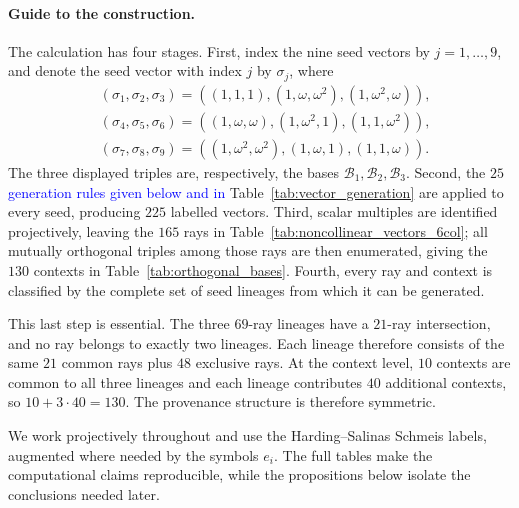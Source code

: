 \documentclass[%
  reprint,
  superscriptaddress,
  showkeys,
  amsmath,amssymb,
  aps,pra,
  longbibliography,
  floatfix,
  x11names
]{revtex4-2}
\DeclareRobustCommand{\chg}[1]{\textcolor{blue}{#1}}
\begin{document}
\paragraph*{Guide to the construction.}
The calculation has four stages.  
First, index the nine seed vectors 
by $j=1,\ldots,9$, and denote 
the seed vector with index $j$ by 
$\sigma_j$, where
\[
\begin{aligned}
&\ensuremath{(\sigma_1,\sigma_2,\sigma_3)=((1,1,1),(1,\omega,\omega^2),(1,\omega^2,\omega))},\\
&\ensuremath{(\sigma_4,\sigma_5,\sigma_6)=((1,\omega,\omega),(1,\omega^2,1),(1,1,\omega^2))},\\
&\ensuremath{(\sigma_7,\sigma_8,\sigma_9)=((1,\omega^2,\omega^2),(1,\omega,1),(1,1,\omega))}.
\end{aligned}
\]
The three displayed triples are, respectively, the bases \(\mathcal B_1,\mathcal B_2,\mathcal B_3\).
Second, the $25$ \chg{generation rules given below and in} Table~\ref{tab:vector_generation} are applied to every seed, producing $225$ labelled vectors.  Third, scalar multiples are identified projectively, leaving the $165$ rays in Table~\ref{tab:noncollinear_vectors_6col}; all mutually orthogonal triples among those rays are then enumerated, giving the $130$ contexts in Table~\ref{tab:orthogonal_bases}.  Fourth, every ray and context is classified by the complete set of seed lineages from which it can be generated.

This last step is essential.  The three $69$-ray lineages have a $21$-ray intersection, and no ray belongs to exactly two lineages.  Each lineage therefore consists of the same $21$ common rays plus $48$ exclusive rays.  At the context level, $10$ contexts are common to all three lineages and each lineage contributes $40$ additional contexts, so $10+3\cdot40=130$.  The provenance structure is therefore symmetric.

We work projectively throughout and use the Harding--Salinas Schmeis labels, augmented where needed by the symbols $e_i$.  The full tables make the computational claims reproducible, while the propositions below isolate the conclusions needed later.
\end{document}
